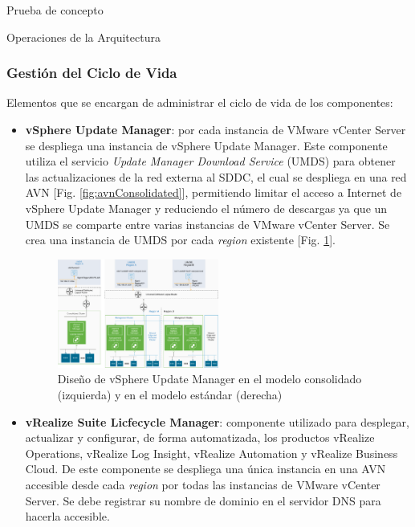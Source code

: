 \begin{section}{Prueba de concepto}
\begin{subsection}{Operaciones de la Arquitectura\cite{CFopermanagement}}
\subsubsection{Gestión del Ciclo de Vida}
Elementos que se encargan de administrar el ciclo de vida de los componentes:
\begin{itemize}
    \item \textbf{vSphere Update Manager}: por cada instancia de VMware vCenter Server se despliega una instancia de vSphere Update Manager. Este componente utiliza el servicio \textit{Update Manager Download Service} (UMDS) para obtener las actualizaciones de la red externa al SDDC, el cual se despliega en una red AVN [Fig. \ref{fig:avnConsolidated}], permitiendo limitar el acceso a Internet de vSphere Update Manager y reduciendo el número de descargas ya que un UMDS se comparte entre varias instancias de VMware vCenter Server. Se crea una instancia de UMDS por cada \textit{region} existente [Fig. \ref{fig:UpdateManagerArc}].
    \begin{figure}[h!]
        \centering
        \includegraphics[width=0.5\textwidth]{imaxes/conceptosPrevios/UpdateManagerArch.png}
        \caption{Diseño de vSphere Update Manager en el modelo consolidado (izquierda) y en el modelo estándar (derecha)}
        \label{fig:UpdateManagerArc}
    \end{figure}
    \FloatBarrier
    
    \item \textbf{vRealize Suite Licfecycle Manager}: componente utilizado para desplegar, actualizar y configurar, de forma automatizada, los productos vRealize Operations, vRealize Log Insight, vRealize Automation y vRealize Business Cloud. De este componente se despliega una única instancia en una AVN accesible desde cada \textit{region} por todas las instancias de VMware vCenter Server. Se debe registrar su nombre de dominio en el servidor DNS para hacerla accesible.
    

\end{itemize}
\end{subsection}
\end{section}
